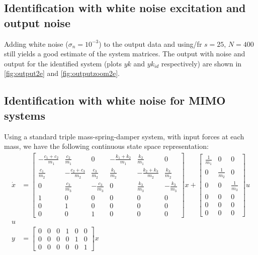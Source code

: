 \documentclass[11pt,a4paper]{article}
\begin{document}
\subsection{Identification with white noise excitation and output noise}
Adding white noise ($\sigma_n = 10^{-3}$) to the output data and using/fr
\mbox{$s = 25$}, \mbox{$N = 400$} still yields a good estimate of the system
matrices. The output with noise and output for the identified system (plots
$yk$ and $yk_{id}$ respectively) are shown in \autoref{fig:output2e} and
\autoref{fig:outputzoom2e}.

\subsection{Identification with white noise for MIMO systems}
Using a standard triple mass-spring-damper system, with input forces at each
mass, we have the following continuous state space representation:
\begin{align}
    \dot{x} &=
        \begin{bmatrix}
            -\frac{c_1+c_2}{m_1} & \frac{c_2}{m_1} & 0 &
                -\frac{k_1+k_2}{m_1} & \frac{k_2}{m_1} & 0 \\
            \frac{c_1}{m_2} & -\frac{c_2 + c_3}{m_2} & \frac{c_3}{m_2} &
                \frac{k_1}{m_2} & -\frac{k_2 + k_3}{m_2} & \frac{k_3}{m_2} \\
            0 & \frac{c_3}{m_3} & -\frac{c_3}{m_3} &
                0 & \frac{k_3}{m_3} & -\frac{k_3}{m_3} \\
            1 & 0 & 0 & 0 & 0 & 0 \\
            0 & 1 & 0 & 0 & 0 & 0 \\
            0 & 0 & 1 & 0 & 0 & 0
        \end{bmatrix} x
        +
         \begin{bmatrix}
             \frac{1}{m_1} & 0 & 0 \\
             0 & \frac{1}{m_2} & 0 \\
             0 & 0 & \frac{1}{m_3} \\
             0 & 0 & 0 \\
             0 & 0 & 0 \\
             0 & 0 & 0
         \end{bmatrix} u \\
        u \\
    y &= \begin{bmatrix}
        0 & 0 & 0 & 1 & 0 & 0 \\
        0 & 0 & 0 & 0 & 1 & 0 \\
        0 & 0 & 0 & 0 & 0 & 1
        \end{bmatrix} x
\end{align}
\end{document}

